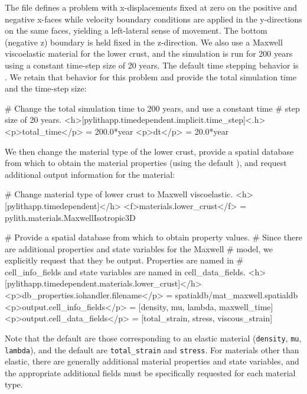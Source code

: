 The  file defines a problem with x-displacements
fixed at zero on the positive and negative x-faces while velocity
boundary conditions are applied in the y-directions on the same faces,
yielding a left-lateral sense of movement. The bottom (negative z)
boundary is held fixed in the z-direction. We also use a Maxwell viscoelastic
material for the lower crust, and the simulation is run for 200 years
using a constant time-step size of 20 years. The default time stepping
behavior is . We retain that behavior for
this problem and provide the total simulation time and the time-step
size:
\begin{cfg}
# Change the total simulation time to 200 years, and use a constant time
# step size of 20 years.
<h>[pylithapp.timedependent.implicit.time_step]<.h>
<p>total_time</p> = 200.0*year
<p>dt</p> = 20.0*year 
\end{cfg}
We then change the material type of the lower crust, provide a spatial
database from which to obtain the material properties (using the default
), and request additional output information for
the material:
\begin{cfg}
# Change material type of lower crust to Maxwell viscoelastic.
<h>[pylithapp.timedependent]</h>
<f>materials.lower_crust</f> = pylith.materials.MaxwellIsotropic3D

# Provide a spatial database from which to obtain property values.
# Since there are additional properties and state variables for the Maxwell
# model, we explicitly request that they be output. Properties are named in
# cell_info_fields and state variables are named in cell_data_fields.
<h>[pylithapp.timedependent.materials.lower_crust]</h>
<p>db_properties.iohandler.filename</p> = spatialdb/mat_maxwell.spatialdb
<p>output.cell_info_fields</p> = [density, mu, lambda, maxwell_time]
<p>output.cell_data_fields</p> = [total_strain, stress, viscous_strain]
\end{cfg}
Note that the default  are those
corresponding to an elastic material (\texttt{density}, \texttt{mu},
\texttt{lambda}), and the default 
are \texttt{total\_strain} and \texttt{stress}. For materials other
than elastic, there are generally additional material properties and
state variables, and the appropriate additional fields must be specifically
requested for each material type.


